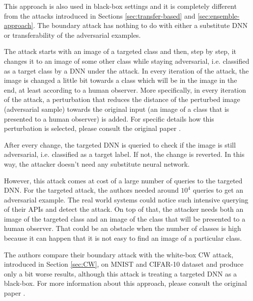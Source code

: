 This approach is also used in black-box settings and it is completely different from the attacks introduced in Sections \ref{sec:transfer-based} and \ref{sec:ensemble-approach}. The boundary attack has nothing to do with either a substitute DNN or transferability of the adversarial examples. 

The attack starts with an image of a targeted class and then, step by step, it changes it to an image of some other class while staying adversarial, i.e. classified as a target class by a DNN under the attack. In every iteration of the attack, the image is changed a little bit towards a class which will be in the image in the end, at least according to a human observer. More specifically, in every iteration of the attack, a perturbation that reduces the distance of the perturbed image (adversarial sample) towards the original input (an image of a class that is presented to a human observer) is added. For specific details how this perturbation is selected, please consult the original paper \cite{brendel2018decisionbased}.

After every change, the targeted DNN is queried to check if the image is still adversarial, i.e. classified as a target label. If not, the change is reverted. In this way, the attacker doesn't need any substitute neural network. 

However, this attack comes at cost of a large number of queries to the targeted DNN. For the targeted attack, the authors needed around $10^4$ queries to get an adversarial example. The real world systems could notice such intensive querying of their APIs and detect the attack. On top of that, the attacker needs both an image of the targeted class and an image of the class that will be presented to a human observer. That could be an obstacle when the number of classes is high because it can happen that it is not easy to find an image of a particular class.

The authors compare their boundary attack with the white-box CW attack, introduced in Section \ref{sec:CW}, on MNIST and CIFAR-10 dataset and produce only a bit worse results, although this attack is treating a targeted DNN as a black-box.  For more information about this approach, please consult the original paper \cite{brendel2018decisionbased}.
